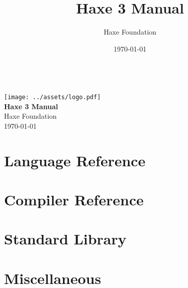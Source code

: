 \documentclass{../haxe}
\renewcommand{\maketitle}{
   \begin{titlepage}
     \setcounter{page}{-1}
			\begin{center}
				~\\[3cm]
				\texttt{[image: ../assets/logo.pdf]}~\\[1cm]
				{\huge \bfseries Haxe 3 Manual}\\[7cm]
				Haxe Foundation\\
				\today
			\end{center}
   \end{titlepage}
}
\begin{document}
\title{Haxe 3 Manual}
\author{Haxe Foundation}
\date{\today}
\maketitle


\clearpage

\clearpage
\tableofcontents
\clearpage



\part{Language Reference}






\part{Compiler Reference}




\part{Standard Library}


\part{Miscellaneous}



\end{document}
